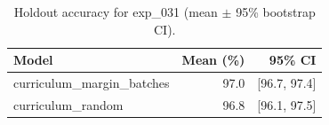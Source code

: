 \begin{table}[ht]
\centering
\caption{Holdout accuracy for exp_031 (mean $\pm$ 95\% bootstrap CI).}
\label{tab:exp_031}
\begin{tabular}{lrr}
\toprule
Model & Mean (\%) & 95\% CI \\
\midrule
curriculum\_margin\_batches & 97.0 & [96.7, 97.4] \\
curriculum\_random & 96.8 & [96.1, 97.5] \\
\bottomrule
\end{tabular}
\end{table}
